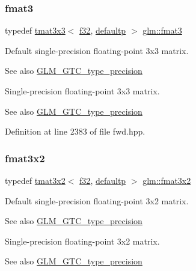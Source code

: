 \subsubsection{\texorpdfstring{fmat3}{fmat3}}
{\footnotesize\ttfamily typedef \mbox{\hyperlink{structglm_1_1tmat3x3}{tmat3x3}}$<$ \mbox{\hyperlink{group__gtc__type__precision_ga0ec999b57f5330d9021256e96038df04}{f32}}, \mbox{\hyperlink{namespaceglm_a0f04f086094c747d227af4425893f545a9d21ccd8b5a009ec7eb7677befc3bf51}{defaultp}} $>$ \mbox{\hyperlink{group__gtc__type__precision_ga17dec8b2e3d19b235b0749b8ac9f2217}{glm\+::fmat3}}}

Default single-\/precision floating-\/point 3x3 matrix. \begin{DoxySeeAlso}{See also}
\mbox{\hyperlink{group__gtc__type__precision}{G\+L\+M\+\_\+\+G\+T\+C\+\_\+type\+\_\+precision}}
\end{DoxySeeAlso}
Single-\/precision floating-\/point 3x3 matrix. \begin{DoxySeeAlso}{See also}
\mbox{\hyperlink{group__gtc__type__precision}{G\+L\+M\+\_\+\+G\+T\+C\+\_\+type\+\_\+precision}} 
\end{DoxySeeAlso}


Definition at line 2383 of file fwd.\+hpp.

\mbox{\label{group__gtc__type__precision_gab194ac1a68dbcb228384112ebe531c67}} 
\subsubsection{\texorpdfstring{fmat3x2}{fmat3x2}}
{\footnotesize\ttfamily typedef \mbox{\hyperlink{structglm_1_1tmat3x2}{tmat3x2}}$<$ \mbox{\hyperlink{group__gtc__type__precision_ga0ec999b57f5330d9021256e96038df04}{f32}}, \mbox{\hyperlink{namespaceglm_a0f04f086094c747d227af4425893f545a9d21ccd8b5a009ec7eb7677befc3bf51}{defaultp}} $>$ \mbox{\hyperlink{group__gtc__type__precision_gab194ac1a68dbcb228384112ebe531c67}{glm\+::fmat3x2}}}

Default single-\/precision floating-\/point 3x2 matrix. \begin{DoxySeeAlso}{See also}
\mbox{\hyperlink{group__gtc__type__precision}{G\+L\+M\+\_\+\+G\+T\+C\+\_\+type\+\_\+precision}}
\end{DoxySeeAlso}
Single-\/precision floating-\/point 3x2 matrix. \begin{DoxySeeAlso}{See also}
\mbox{\hyperlink{group__gtc__type__precision}{G\+L\+M\+\_\+\+G\+T\+C\+\_\+type\+\_\+precision}} 
\end{DoxySeeAlso}


